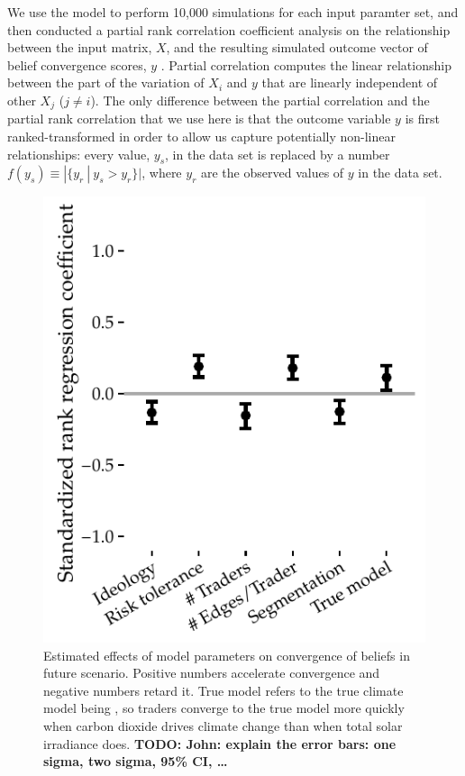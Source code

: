\documentclass{wscpaperproc}\usepackage[]{graphicx}\usepackage[]{color}
\makeatletter
\def\maxwidth{ %
  \ifdim\Gin@nat@width>\linewidth
    \linewidth
  \else
    \Gin@nat@width
  \fi
}
\newenvironment{knitrout}{}{} %
\makeatother
\begin{document}
We use the model to perform 10,000 simulations for each input paramter set, and then conducted a partial rank correlation coefficient analysis on the relationship between the input matrix, $X$, and the resulting simulated outcome vector of belief convergence scores, $y$ . Partial correlation computes the linear relationship between the part of the variation of $X_i$ and $y$ that are linearly independent of other $X_j$  ($j \neq i$).  The only difference between the partial correlation and the partial rank correlation that we use here is that the outcome variable $y$ is first ranked-transformed in order to allow us capture potentially non-linear relationships: every value, $y_s$, in the data set is replaced by a number 
$f(y_s) \equiv |\{y_r~|~ y_s > y_r\}|$, 
where $y_r$ are the observed values of $y$ in the data set.

\begin{knitrout}
\color{fgcolor}\begin{figure}

{\centering \includegraphics[width=\maxwidth]{figure/sa-1} 

}

\caption{Estimated effects of model parameters on convergence of beliefs in future scenario. Positive numbers accelerate convergence and negative numbers retard it. True model refers to the true climate model being , so traders converge to the true model more quickly when carbon dioxide drives climate change than when total solar irradiance does. \textbf{TODO: John: explain the error bars: one sigma, two sigma, 95\% CI, \dots}}\label{fig:sa}
\end{figure}


\end{knitrout}
\end{document}
